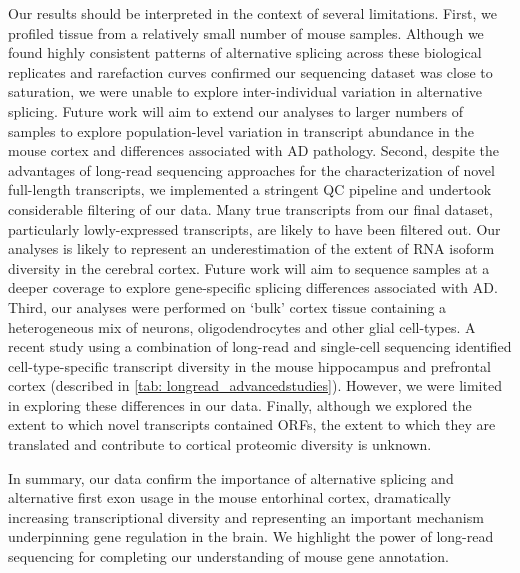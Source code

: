 Our results should be interpreted in the context of several limitations. First, we profiled tissue from a relatively small number of mouse samples. Although we found highly consistent patterns of alternative splicing across these biological replicates and rarefaction curves confirmed our sequencing dataset was close to saturation, we were unable to explore inter-individual variation in alternative splicing. Future work will aim to extend our analyses to larger numbers of samples to explore population-level variation in transcript abundance in the mouse cortex and differences associated with AD pathology. Second, despite the advantages of long-read sequencing approaches for the characterization of novel full-length transcripts, we implemented a stringent QC pipeline and undertook considerable filtering of our data. Many true transcripts from our final dataset, particularly lowly-expressed transcripts, are likely to have been filtered out. Our analyses is likely to represent an underestimation of the extent of RNA isoform diversity in the cerebral cortex. Future work will aim to sequence samples at a deeper coverage to explore gene-specific splicing differences associated with AD. Third, our analyses were performed on ‘bulk’ cortex tissue containing a heterogeneous mix of neurons, oligodendrocytes and other glial cell-types. A recent study using a combination of long-read and single-cell sequencing identified cell-type-specific transcript diversity in the mouse hippocampus and prefrontal cortex\cite{Joglekar2021} (described in \cref{tab: longread_advancedstudies}). However, we were limited in exploring these differences in our data. Finally, although we explored the extent to which novel transcripts contained ORFs, the extent to which they are translated and contribute to cortical proteomic diversity is unknown.  
 
In summary, our data confirm the importance of alternative splicing and alternative first exon usage in the mouse entorhinal cortex, dramatically increasing transcriptional diversity and representing an important mechanism underpinning gene regulation in the brain. We highlight the power of long-read sequencing for completing our understanding of mouse gene annotation.

